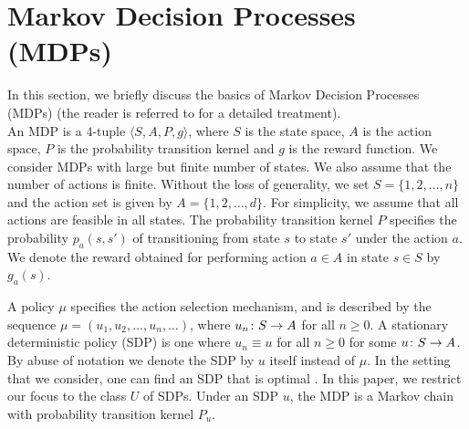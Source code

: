 \section{Markov Decision Processes (MDPs)}
In this section, we briefly discuss the basics of Markov Decision Processes (MDPs) (the reader is referred to \cite{BertB,Puter} for a detailed treatment).\\
An MDP is a $4$-tuple $\langle S,A,P,g\rangle$, where $S$ is the state space, $A$ is the action space, $P$ is the probability transition kernel and $g$ is the reward function. We consider MDPs with large but finite number of states. We also assume that the number of actions is finite.
Without the loss of generality, we set  $S=\{1,2,\ldots,n\}$  and the action set is given by $A=\{1,2,\ldots,d\}$. For simplicity, we assume that all actions are feasible in all states. The probability transition kernel $P$ specifies the probability $p_a(s,s')$ of transitioning from state $s$ to state $s'$ under the action $a$. We denote the reward obtained for performing action $a\in A$ in state $s\in S$ by $g_a(s)$.

A policy $\mu$ specifies the action selection mechanism, and is described by the sequence $\mu=(u_1,u_2,\ldots,u_n,\ldots)$, where $u_n\colon S \rightarrow A$ for all $n \geq 0$.  
A stationary deterministic policy (SDP) is one where $u_n\equiv u$ for all $n\geq 0$ for some $u\colon S \rightarrow A$. By abuse of notation we denote the SDP by $u$ itself instead of $\mu$. In the setting that we consider, one can find an SDP that is optimal \cite{BertB,Puter}. In this paper, we restrict our focus to the class $U$ of SDPs.  Under an SDP $u$, the MDP is a Markov chain with probability transition kernel $P_u$.

